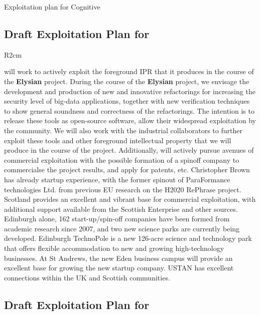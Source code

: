 \documentclass[a4paper,11pt]{article}
\newcommand{\project}[1]{\textbf{#1}\xspace}
\newcommand{\SECURITY}{\project{Elysian}}
\newcommand{\TheProject}{\SECURITY}
\begin{document}
Exploitation plan for Cognitive

\horizontalline

\subsection*{Draft Exploitation Plan for \SAshort{}}

\begin{wrapfigure}{R}{2cm}
\vspace{-1.4cm}
\hfill {}
\vspace{-0.9cm}
\end{wrapfigure}

\SAshort{} will work to actively exploit the foreground IPR that it produces in the course of the \TheProject{} project. During the course of the \TheProject{} project, we envisage the development and production of new and innovative refactorings for increasing the security level of big-data applications, together with new verification techniques to show general soundness and correctness of the refactorings. The intention is to release these tools as open-source software, allow their widespread exploitation by the community. We will also work with the industrial collaborators to further exploit these tools and other foreground intellectual property that we will produce in the course of the project. 
Additionally, \SAshort{} will actively pursue avenues of commercial exploitation with the possible formation of a spinoff company to commercialse the project results, and apply for patents, etc. Christopher Brown has already startup experience, with the former spinout of ParaFormance technologies Ltd. from previous EU research on the H2020 RePhrase project. Scotland provides an excellent and vibrant base for commercial exploitation, with additional support available from the Scottish Enterprise and other sources.  Edinburgh alone, 162 start-up/spin-off companies have been formed from academic research since 2007, and two new science parks are currently being developed. Edinburgh TechnoPole is a new 126-acre science and technology park that offers flexible accommodation to new and growing high-technology businesses. At St Andrews, the new Eden business campus will provide an excellent base for growing the new startup company. USTAN has excellent connections within the UK and Scottish communities.

\horizontalline

\subsection*{Draft Exploitation Plan for \UODshort{}}
\end{document}
